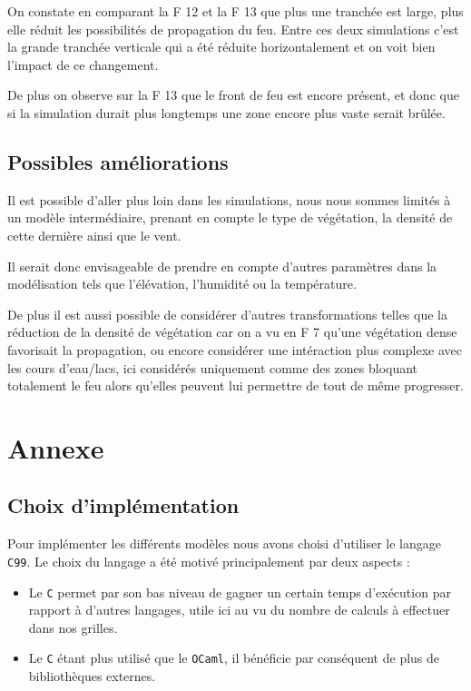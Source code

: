\documentclass[12pt]{article}
\newcommand{\fig}[1]{
    F\resizebox{!}{1.3ex}{IGURE} #1
}
\begin{document}
On constate en comparant la\fig{12}et la\fig{13}que plus une tranchée est large, plus elle réduit les possibilités de propagation du feu. Entre ces deux simulations c'est la grande tranchée verticale qui a été réduite horizontalement et on voit bien l'impact de ce changement.

De plus on observe sur la\fig{13}que le front de feu est encore présent, et donc que si la simulation durait plus longtemps une zone encore plus vaste serait brûlée.

\subsection{Possibles améliorations}

Il est possible d'aller plus loin dans les simulations, nous nous sommes limités à un modèle intermédiaire, prenant en compte le type de végétation, la densité de cette dernière ainsi que le vent.

Il serait donc envisageable de prendre en compte d'autres paramètres dans la modélisation tels que l'élévation, l'humidité ou la température.

De plus il est aussi possible de considérer d'autres transformations telles que la réduction de la densité de végétation car on a vu en\fig{7}qu'une végétation dense favorisait la propagation, ou encore considérer une intéraction plus complexe avec les cours d'eau/lacs, ici considérés uniquement comme des zones bloquant totalement le feu alors qu'elles peuvent lui permettre de tout de même progresser.

\section{Annexe}

\subsection{Choix d'implémentation}

Pour implémenter les différents modèles nous avons choisi d'utiliser le langage \texttt{C99}. Le choix du langage a été motivé principalement par deux aspects :

\begin{itemize}
    \item Le \texttt{C} permet par son bas niveau de gagner un certain temps d'exécution par rapport à d'autres langages, utile ici au vu du nombre de calculs à effectuer dans nos grilles.
    \item Le \texttt{C} étant plus utilisé que le \texttt{OCaml}, il bénéficie par conséquent de plus de bibliothèques externes.
\end{itemize}
\end{document}
